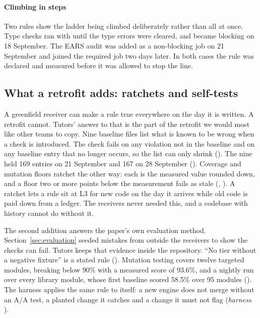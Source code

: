 \paragraph{Climbing in steps} Two rules show the ladder being climbed deliberately rather than
all at once. Type checks ran with  until the type errors were cleared,
and became blocking on 18 September. The EARS audit was added as a non-blocking job on
21 September and joined the required  job two days later. In both cases the
rule was declared and measured before it was allowed to stop the line.

\subsection{What a retrofit adds: ratchets and self-tests}

A greenfield receiver can make a rule true everywhere on the day it is written. A retrofit
cannot. Tutors' answer to that is the part of the retrofit we would most like other teams to
copy. Nine baseline files list what
is known to be wrong when a check is introduced. The check fails on any violation not in the
baseline and on any baseline entry that no longer occurs, so the list can only shrink
(). The nine held 169 entries on 21 September and 167 on
28 September (). Coverage and mutation floors ratchet the other way: each is the
measured value rounded down, and a floor two or more points below the measurement fails as stale
(, ).
A ratchet lets a rule sit at L3 for new code on the day it arrives while old code is paid down
from a ledger. The receivers never needed this, and a codebase with history cannot do without it.

The second addition answers the paper's own evaluation method. Section~\ref{sec:evaluation}
seeded mistakes from outside the receivers to show the checks can fail. Tutors keeps that
evidence inside the repository. ``No tier without a negative fixture'' is a stated rule
(). Mutation testing covers twelve targeted modules, breaking below 90\% with
a measured score of 93.6\%, and a nightly run over every library module, whose first baseline
scored 58.5\% over 95 modules (). The harness applies
the same rule to itself: a new engine does not merge without an A/A test, a planted change it
catches and a change it must not flag (\emph{harness} ).

